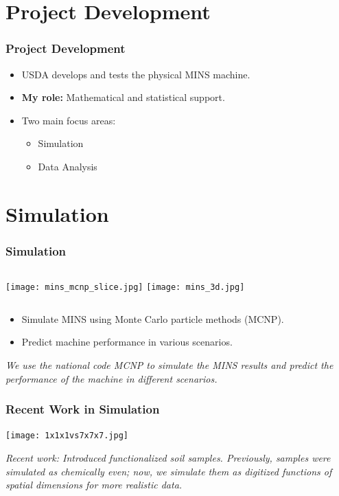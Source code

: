 \documentclass[notheorems,11pt,compress]{beamer}
\begin{document}
\section{Project Development}

\begin{frame}
\frametitle{Project Development}
\begin{itemize}
    \item USDA develops and tests the physical MINS machine.
    \item \textbf{My role:} Mathematical and statistical support.
    \item Two main focus areas:
    \begin{itemize}
        \item Simulation
        \item Data Analysis
    \end{itemize}
\end{itemize}
\end{frame}

\section{Simulation}

\begin{frame}
\frametitle{Simulation}
\begin{columns}
\texttt{[image: mins\_mcnp\_slice.jpg]}
\texttt{[image: mins\_3d.jpg]}
\end{columns}
\vspace{1em}
\begin{itemize}
    \item Simulate MINS using Monte Carlo particle methods (MCNP).
    \item Predict machine performance in various scenarios.
\end{itemize}
\small
\textit{We use the national code MCNP to simulate the MINS results and predict the performance of the machine in different scenarios.}
\end{frame}

\begin{frame}
\frametitle{Recent Work in Simulation}
\begin{center}
\texttt{[image: 1x1x1vs7x7x7.jpg]}
\end{center}
\small
\textit{Recent work: Introduced functionalized soil samples. Previously, samples were simulated as chemically even; now, we simulate them as digitized functions of spatial dimensions for more realistic data.}
\end{frame}
\end{document}

